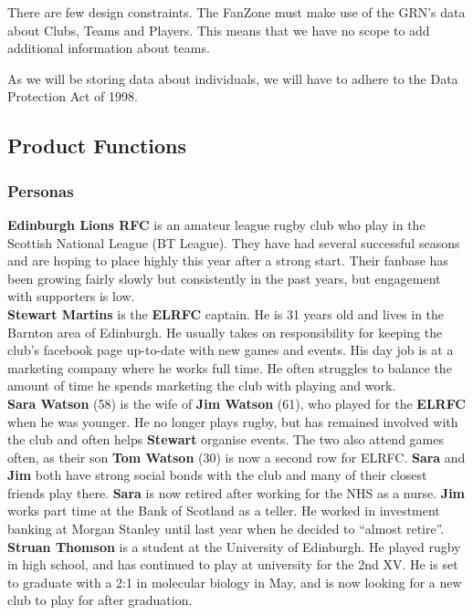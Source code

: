 \documentclass[10pt,a4paper]{article}
\begin{document}
There are few design constraints. The FanZone must make use of the GRN's data about Clubs, Teams and Players. This means that we have no scope to add additional information about teams. 

As we will be storing data about individuals, we will have to adhere to the Data Protection Act of 1998.


\subsection{Product Functions}

\subsubsection{Personas}


\textbf{Edinburgh Lions RFC} is an amateur league rugby club who play in the Scottish National League (BT League). They have had several successful seasons and are hoping to place highly this year after a strong start. Their fanbase has been growing fairly slowly but consistently in the past years, but engagement with supporters is low. \\


\textbf{Stewart Martins} is the \textbf{ELRFC} captain. He is 31 years old and lives in the Barnton area of Edinburgh. He usually takes on responsibility for keeping the club’s facebook page up-to-date with new games and events. His day job is at a marketing company where he works full time. He often struggles to balance the amount of time he spends marketing the club with playing and work. \\


\textbf{Sara Watson} (58) is the wife of \textbf{Jim Watson} (61), who played for the \textbf{ELRFC} when he was younger. He no longer plays rugby, but has remained involved with the club and often helps \textbf{Stewart} organise events. The two also attend games often, as their son \textbf{Tom Watson} (30) is now a second row for ELRFC. \textbf{Sara} and \textbf{Jim} both have strong social bonds with the club and many of their closest friends play there. \textbf{Sara} is now retired after working for the NHS as a nurse. \textbf{Jim} works part time at the Bank of Scotland as a teller. He worked in investment banking at Morgan Stanley until last year when he decided to “almost retire”. \\


\textbf{Struan Thomson} is a student at the University of Edinburgh. He played rugby in high school, and has continued to play at university for the 2nd XV. He is set to graduate with a 2:1 in molecular biology in May, and is now looking for a new club to play for after graduation.\\
\end{document}
